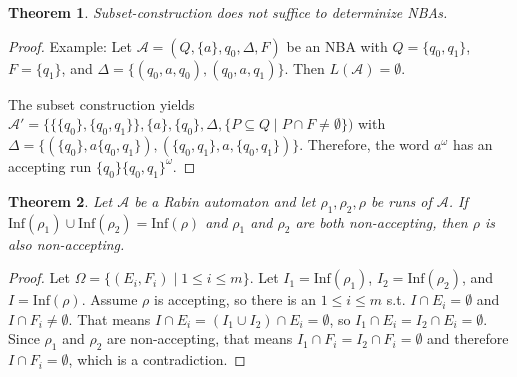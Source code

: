\documentclass{article}
\newtheorem{theorem}{Theorem}[section]
\begin{document}
\vspace{.5cm}
\begin{theorem}
	Subset-construction does not suffice to determinize NBAs.
\end{theorem}
\begin{proof}
	Example: Let $\mathcal{A} = (Q, \{a\}, q_0, \Delta, F)$ be an NBA with $Q = \{q_0, q_1\}$, $F = \{q_1\}$, and $\Delta = \{(q_0, a, q_0), (q_0, a, q_1)\}$. Then $L(\mathcal{A}) = \emptyset$.
	
	The subset construction yields $\mathcal{A}' = \{ \{ \{q_0\}, \{q_0, q_1\} \}, \{a\}, \{q_0\}, \Delta, \{ P \subseteq Q \mid P \cap F \neq \emptyset\})$ with $\Delta = \{ (\{q_0\}, a \{q_0, q_1\}), (\{ q_0, q_1 \}, a, \{ q_0, q_1\} ) \}$. Therefore, the word $a^\omega$ has an accepting run $\{q_0\} \{q_0, q_1\}^\omega$.
\end{proof}


\vspace{.5cm}
\begin{theorem}
\label{union_lemma}
	Let $\mathcal{A}$ be a Rabin automaton and let $\rho_1, \rho_2, \rho$ be runs of $\mathcal{A}$. If $\text{Inf}(\rho_1) \cup \text{Inf}(\rho_2) = \text{Inf}(\rho)$ and $\rho_1$ and $\rho_2$ are both non-accepting, then $\rho$ is also non-accepting.
\end{theorem}
\begin{proof}
	Let $\Omega = \{ (E_i, F_i) \mid 1 \leq i \leq m \}$. Let $I_1 = \text{Inf}(\rho_1)$, $I_2 = \text{Inf}(\rho_2)$, and $I = \text{Inf}(\rho)$. Assume $\rho$ is accepting, so there is an $1 \leq i \leq m$ s.t. $I \cap E_i = \emptyset$ and $I \cap F_i \neq \emptyset$. That means $I \cap E_i = (I_1 \cup I_2) \cap E_i = \emptyset$, so $I_1 \cap E_i = I_2 \cap E_i = \emptyset$. Since $\rho_1$ and $\rho_2$ are non-accepting, that means $I_1 \cap F_i = I_2 \cap F_i = \emptyset$ and therefore $I \cap F_i = \emptyset$, which is a contradiction.
\end{proof}
\end{document}
